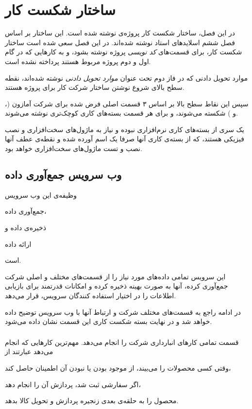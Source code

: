 \chapter{ساختار شکست کار}
در این فصل، ساختار شکست کار پروژه‌ی
نوشته شده است. این ساختار بر اساس فصل ششم اسلاید‌های استاد نوشته شده‌اند. در این فصل سعی شده است ساختار شکست کار، برای قسمت‌های \textit{کد نویسی} پروژه نوشته بشود، و به کارهایی که در گام اول و دوم پروژه مربوط هستند پرداخته نشده ‌است.

موارد تحویل دادنی که در فاز دوم تحت عنوان \textit{موارد تحویل دادنی} نوشته شده‌اند، نقطه سطح بالای شروع نوشتن ساختار شرکت کار برای پروژه 
هستند.

سپس این نقاط سطح بالا بر اساس ۳ قسمت اصلی فرض شده برای شرکت آمازون (،  و ) شکسته می‌شوند، و برای هر قسمت بسته‌های کاری کوچک‌تری نوشته می‌شوند.

یک سری از بسته‌های کاری نرم‌افزاری نبوده و نیاز به ماژول‌های سخت‌افزاری و نصب فیزیکی هستند، که از بسته‌ی کاری آنها صرفا یک اسم آورده شده و نقطه‌ی عطف آنها نصب و تست ماژول‌‌های سخت‌افزاری خواهد بود.


\section{وب سرویس جمع‌آوری داده}\label{sec:gatherer}
وظیفه‌ی این وب سرویس
\begin{enumerate*}
\item 
جمع‌آوری داده،
\item 
ذخیره‌ی داده و
\item 
ارائه داده
\end{enumerate*}
است.

این سرویس تمامی داده‌های مورد نیاز را از قسمت‌های مختلف و اصلی شرکت جمع‌آوری کرده، آنها به صورت بهینه ذخیره کرده و امکانات قدرتمند برای بازیابی اطلاعات را در اختیار استفاده کنندگان سرویس، قرار می‌دهد.

در ادامه راجع به قسمت‌های مختلف شرکت و ارتباط آنها با وب سرویس توضیح داده خواهد شد و در نهایت بسته شکست کاری این قسمت نشان داده می‌شود.

\subsection{}\label{ssec:stock}
قسمت  تمامی کار‌‌های انبار‌داری شرکت را انجام می‌دهد. مهم‌ترین کار‌هایی که انجام می‌دهد عبارتند از
\begin{enumerate*}
\item 
وقتی کسی محصولات را می‌بیند، از موجود بودن یا نبودن‌ آن اطمینان حاصل کند،
\item 
اگر سفارشی ثبت شد، پردازش آن را انجام دهد،

\item 
محصول را به حلقه‌ی بعدی زنجیره پردازش و تحویل کالا بدهد.
\end{enumerate*}

